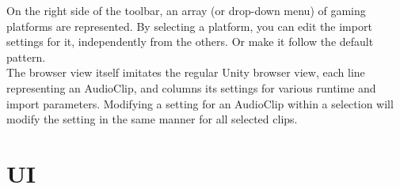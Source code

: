 \documentclass[a4paper,10pt]{article}
\begin{document}
On the right side of the toolbar, an array (or drop-down menu) of gaming platforms are represented. By selecting a platform, you can edit the import settings for it, independently from the others. Or make it follow the default pattern. \\

The browser view itself imitates the regular Unity browser view, each line representing an AudioClip, and columns its settings for various runtime and import parameters. Modifying a setting for an AudioClip within a selection will modify the setting in the same manner for all selected clips. 
%
%
%
%
%
%
%
%


\section{UI}
\end{document}
